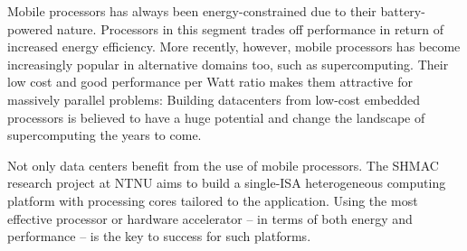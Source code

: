 
Mobile processors has always been energy-constrained due to their
battery-powered nature. Processors in this segment trades off performance in
return of increased energy efficiency. More recently, however, mobile processors
has become increasingly popular in alternative domains too, such as
supercomputing. Their low cost and good performance per Watt ratio makes them
attractive for massively parallel problems: Building datacenters from low-cost
embedded processors is believed to have a huge potential and change the
landscape of supercomputing the years to come.


Not only data centers benefit from the use of mobile processors. The SHMAC
research project at NTNU aims to build a single-ISA heterogeneous computing
platform with processing cores tailored to the application. Using the most
effective processor or hardware accelerator -- in terms of both energy
and performance -- is the key to success for such platforms.




